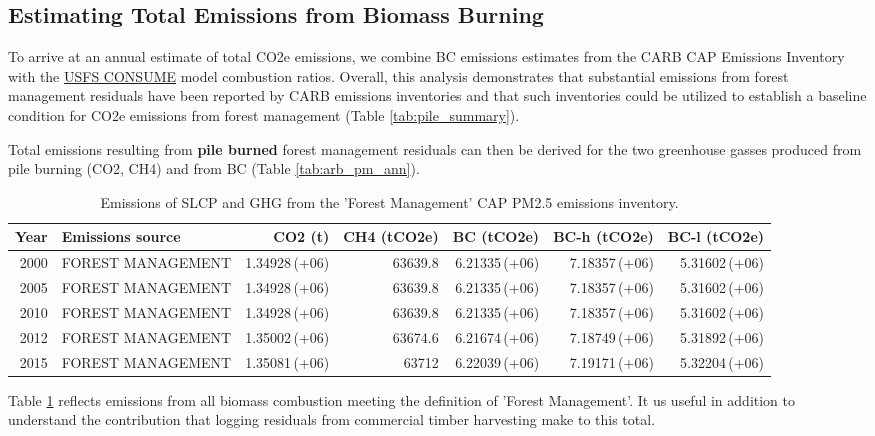 \documentclass[a4paper]{article}
\begin{document}
\subsection{Estimating Total Emissions from Biomass Burning}
\label{sec:orgheadline8}
\label{sec:pile_emissions}

To arrive at an annual estimate of total \ac{CO2e} emissions, we combine \ac{BC} emissions estimates from the \ac{CARB} \ac{CAP} Emissions Inventory with the  \href{http://www.fs.fed.us/pnw/fera/research/smoke/consume/index.shtml}{USFS CONSUME} model combustion ratios. Overall, this analysis demonstrates that substantial emissions from forest management residuals have been reported by CARB emissions inventories and that such inventories could be utilized to establish a baseline condition for \ac{CO2e} emissions from forest management (Table \ref{tab:pile_summary}). 

Total emissions resulting from \textbf{pile burned} forest management residuals
can then be derived for the two greenhouse gasses produced from pile
burning (CO2, CH4) and from BC (Table \ref{tab:arb_pm_ann}).

\begin{table}[htb]
\centering
\begin{tabular}{rlrrrrr}
Year & Emissions source & CO2 (t) & CH4 (tCO2e) & BC (tCO2e) & BC-h (tCO2e) & BC-l (tCO2e)\\
\hline
2000 & FOREST MANAGEMENT & 1.34928\,(+06) & 63639.8 & 6.21335\,(+06) & 7.18357\,(+06) & 5.31602\,(+06)\\
2005 & FOREST MANAGEMENT & 1.34928\,(+06) & 63639.8 & 6.21335\,(+06) & 7.18357\,(+06) & 5.31602\,(+06)\\
2010 & FOREST MANAGEMENT & 1.34928\,(+06) & 63639.8 & 6.21335\,(+06) & 7.18357\,(+06) & 5.31602\,(+06)\\
2012 & FOREST MANAGEMENT & 1.35002\,(+06) & 63674.6 & 6.21674\,(+06) & 7.18749\,(+06) & 5.31892\,(+06)\\
2015 & FOREST MANAGEMENT & 1.35081\,(+06) & 63712 & 6.22039\,(+06) & 7.19171\,(+06) & 5.32204\,(+06)\\
\end{tabular}
\caption{\label{tab:orgtable2}
Emissions of \ac{SLCP} and \ac{GHG} from the 'Forest Management' \ac{CAP} \ac{PM2.5} emissions inventory. \label{tab:ghg_slcp}}

\end{table}

Table \ref{tab:ghg_slcp} reflects emissions from all biomass combustion meeting the definition of 'Forest Management'. It us useful in addition to understand the contribution that logging residuals from commercial timber harvesting make to this total.
\end{document}
